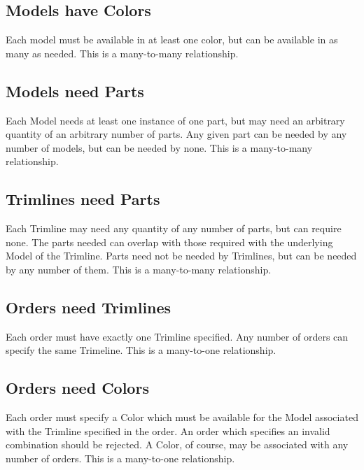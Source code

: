 \documentclass{article}
\begin{document}
\subsection*{Models have Colors}

Each model must be available in at least one color, but can be available in as many as needed.  This is a many-to-many relationship.

\subsection*{Models need Parts}

Each Model needs at least one instance of one part, but may need an arbitrary quantity of an arbitrary number of parts.  Any given part can be needed by any number of models, but can be needed by none.  This is a many-to-many relationship.

\subsection*{Trimlines need Parts}

Each Trimline may need any quantity of any number of parts, but can require none.  The parts needed can overlap with those required with the underlying Model of the Trimline.  Parts need not be needed by Trimlines, but can be needed by any number of them.  This is a many-to-many relationship. 

\subsection*{Orders need Trimlines}

Each order must have exactly one Trimline specified.  Any number of orders can specify the same Trimeline.  This is a many-to-one relationship.

\subsection*{Orders need Colors}

Each order must specify a Color which must be available for the Model associated with the Trimline specified in the order.  An order which specifies an invalid combination should be rejected.  A Color, of course, may be associated with any number of orders.  This is a many-to-one relationship.
\end{document}
